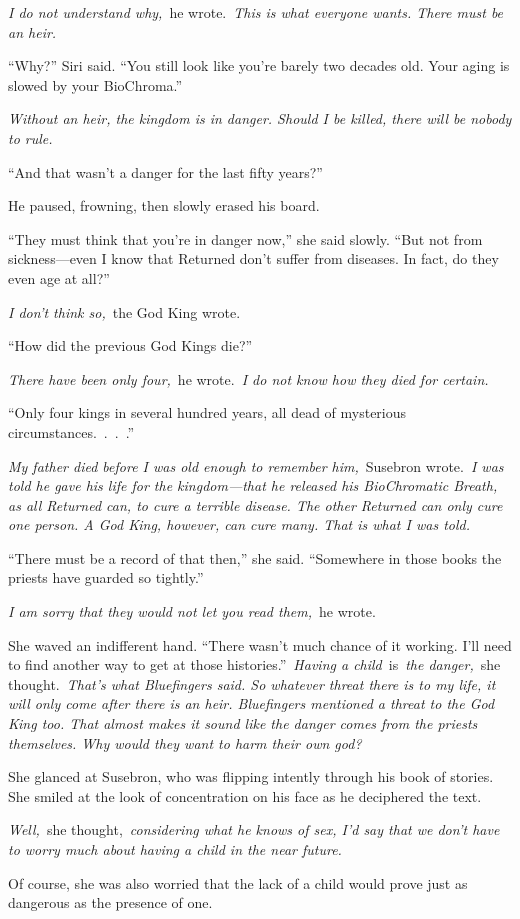\textit{I do not understand why,}~he wrote.~\textit{This is what everyone wants. There must be an heir.}

“Why?” Siri said. “You still look like you’re barely two decades old. Your aging is slowed by your BioChroma.”

\textit{Without an heir, the kingdom is in danger. Should I be killed, there will be nobody to rule.}

“And that wasn’t a danger for the last fifty years?”

He paused, frowning, then slowly erased his board.

“They must think that you’re in danger now,” she said slowly. “But not from sickness—even I know that Returned don’t suffer from diseases. In fact, do they even age at all?”

\textit{I don’t think so,}~the God King wrote.

“How did the previous God Kings die?”

\textit{There have been only four,}~he wrote.~\textit{I do not know how they died for certain.}

“Only four kings in several hundred years, all dead of mysterious circumstances.~.~.~.”

\textit{My father died before I was old enough to remember him,}~Susebron wrote.~\textit{I was told he gave his life for the kingdom—that he released his BioChromatic Breath, as all Returned can, to cure a terrible disease. The other Returned can only cure one person. A God King, however, can cure many. That is what I was told.}

“There must be a record of that then,” she said. “Somewhere in those books the priests have guarded so tightly.”

\textit{I am sorry that they would not let you read them,}~he wrote.

She waved an indifferent hand. “There wasn’t much chance of it working. I’ll need to find another way to get at those histories.”~\textit{Having a child}~is~\textit{the danger,}~she thought.~\textit{That’s what Bluefingers said. So whatever threat there is to my life, it will only come after there is an heir. Bluefingers mentioned a threat to the God King too. That almost makes it sound like the danger comes from the priests themselves. Why would they want to harm their own god?}

She glanced at Susebron, who was flipping intently through his book of stories. She smiled at the look of concentration on his face as he deciphered the text.

\textit{Well,}~she thought,~\textit{considering what he knows of sex, I’d say that we don’t have to worry much about having a child in the near future.}

Of course, she was also worried that the lack of a child would prove just as dangerous as the presence of one.

